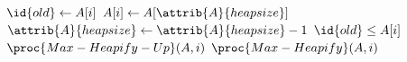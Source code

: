 \begin{codebox}
\li $\id{old} \gets A[i]$
\li $A[i] \gets A[\attrib{A}{heapsize}]$
\li $\attrib{A}{heapsize} \gets \attrib{A}{heapsize} - 1$
\li \If $\id{old} \leq A[i]$
\li \Then $\proc{Max-Heapify-Up}(A,i)$
\li \Else
\li		$\proc{Max-Heapify}(A,i)$
    \End
\end{codebox}